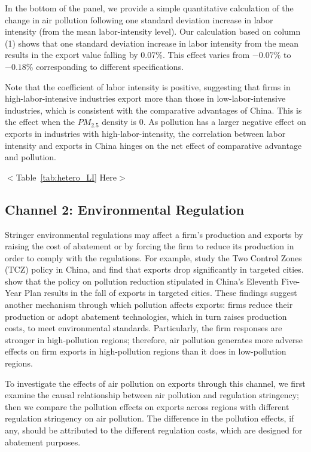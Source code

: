 \documentclass[12pt]{article}
\begin{document}
In the bottom of the panel, we provide a simple quantitative calculation of the change in air pollution following
 one standard deviation increase in labor intensity (from the mean labor-intensity level). Our calculation based on column (1) shows that one standard deviation increase in labor intensity from the mean results in the export value falling by 0.07\%. This effect varies from $-0.07\%$ to $-0.18\%$ corresponding to different specifications.  

Note that the coefficient of labor intensity is positive, suggesting that
firms in high-labor-intensive industries export more than those in
low-labor-intensive industries, which is consistent with the comparative
advantages of China. This is the effect when the $PM_{2.5}$ density is 0. As
pollution has a larger negative effect on exports in industries with
high-labor-intensity, the correlation between labor intensity and exports
in China hinges on the net effect of comparative advantage and pollution.

\begin{center}
  $<$Table~\ref{tab:hetero_LI} Here$>$
  \end{center}

\subsection{Channel 2: Environmental Regulation}
\label{sec:Channel 2}
Stringer environmental regulations may affect a firm's production and exports by raising the cost of abatement or by 
forcing the firm to reduce its production in order to comply with the regulations. For example, \cite%
{hering2014environmental} study the Two Control Zones (TCZ) policy in China, and find that exports drop significantly in targeted cities. \cite%
{shi2018environmental} show that the policy on pollution reduction stipulated in China's
Eleventh Five-Year Plan results in the fall of exports in targeted cities. These findings suggest another mechanism through which pollution affects exports: firms reduce their production or adopt abatement technologies, which in turn raises production costs, to meet environmental standards. Particularly, the firm responses are stronger in high-pollution regions; therefore, air pollution generates more adverse effects on firm exports in high-pollution regions than it does in low-pollution regions.

To investigate the effects of air pollution on exports through this channel, we first examine the causal relationship between air pollution and regulation stringency; then we compare the pollution effects on exports across regions with different regulation stringency on air pollution. The difference in the pollution effects, if any, should be attributed to the different regulation costs, which are designed for abatement purposes. 
\end{document}
